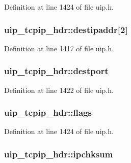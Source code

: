 Definition at line 1424 of file uip.h.

\hypertarget{structuip__tcpip__hdr_a8d4e08d051b35b1c710c3be5b8bbfa05}{
\subsubsection[{destipaddr}]{ {\bf uip\_\-tcpip\_\-hdr::destipaddr}\mbox{[}2\mbox{]}}}
\label{structuip__tcpip__hdr_a8d4e08d051b35b1c710c3be5b8bbfa05}


Definition at line 1417 of file uip.h.

\hypertarget{structuip__tcpip__hdr_a025ffa46b799fa6952719c499a3ae17c}{
\subsubsection[{destport}]{ {\bf uip\_\-tcpip\_\-hdr::destport}}}
\label{structuip__tcpip__hdr_a025ffa46b799fa6952719c499a3ae17c}


Definition at line 1422 of file uip.h.

\hypertarget{structuip__tcpip__hdr_a619d9755a5d4aaabdb2e5e6ea4c1e0bf}{
\subsubsection[{flags}]{ {\bf uip\_\-tcpip\_\-hdr::flags}}}
\label{structuip__tcpip__hdr_a619d9755a5d4aaabdb2e5e6ea4c1e0bf}


Definition at line 1424 of file uip.h.

\hypertarget{structuip__tcpip__hdr_aaf7a8a5310ad945de38f5b3ac755ae7d}{
\subsubsection[{ipchksum}]{ {\bf uip\_\-tcpip\_\-hdr::ipchksum}}}
\label{structuip__tcpip__hdr_aaf7a8a5310ad945de38f5b3ac755ae7d}


